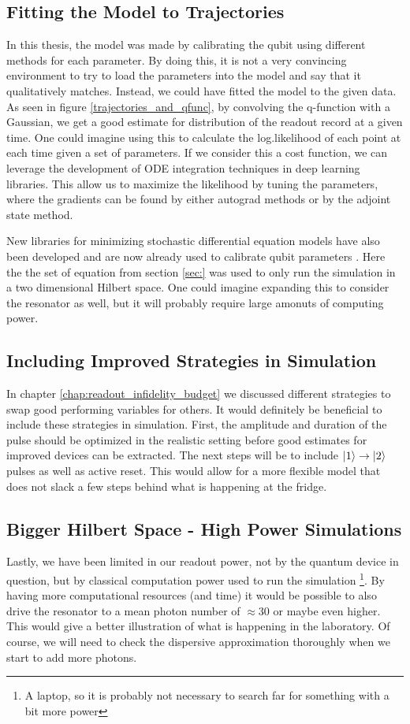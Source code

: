 \subsection{Fitting the Model to Trajectories}
In this thesis, the model was made by calibrating the qubit using different methods for each parameter. By doing this, it is not a very convincing environment to try to load the parameters into the model and say that it qualitatively matches. Instead, we could have fitted the model to the given data. As seen in figure \ref{trajectories_and_qfunc}, by convolving the q-function with a Gaussian, we get a good estimate for distribution of the readout record at a given time. One could imagine using this to calculate the log.likelihood of each point at each time given a set of parameters. If we consider this a cost function, we can leverage the development of ODE integration techniques in deep learning libraries. This allow us to maximize the likelihood by tuning the parameters, where the gradients can be found by either autograd methods or by the adjoint state method. \cite{asdfasdfasedf}

New libraries for minimizing stochastic differential equation models have also been developed and are now already used to calibrate qubit parameters \cite{asadfasdfasdf}. Here the the set of equation from section \ref{sec:} was used to only run the simulation in a two dimensional Hilbert space. One could imagine expanding this to consider the resonator as well, but it will probably require large amonuts of computing power.


\subsection{Including Improved Strategies in Simulation} 
In chapter \ref{chap:readout_infidelity_budget} we discussed different strategies to swap good performing variables for others. It would definitely be beneficial to include these strategies in simulation. First, the amplitude and duration of the pulse should be optimized in the realistic setting before good estimates for improved devices can be extracted. The next steps will be to include $\ket{1}\to\ket{2}$ pulses as well as active reset. This would allow for a more flexible model that does not slack a few steps behind what is happening at the fridge. 

\subsection{Bigger Hilbert Space - High Power Simulations}
Lastly, we have been limited in our readout power, not by the quantum device in question, but by classical computation power used to run the simulation \footnote{A laptop, so it is probably not necessary to search far for something with a bit more power}. By having more computational resources (and time) it would be possible to also drive the resonator to a mean photon number of $\approx30$ or maybe even higher. This would give a better illustration of what is happening in the laboratory. Of course, we will need to check the dispersive approximation thoroughly when we start to add more photons.   